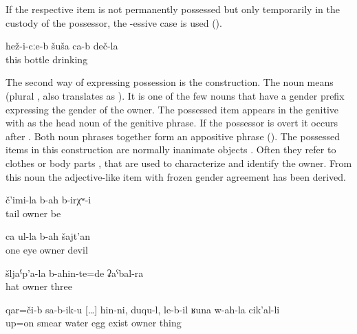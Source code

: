 If the respective item is not permanently possessed but only temporarily in the custody of the possessor, the -essive case is used  ().
%
\begin{exe}
	\ex	\label{ex:‎‎He has a bottle with a drink}
	\gll	hež-i-cːe-b	šuša	ca-b	deč-la\\
		this	bottle		drinking\\
	\glt	{}
\end{exe}

The second way of expressing possession is the  construction. The noun  means  (plural , also translates as ). It is one of the few nouns that have a gender prefix expressing the gender of the owner. The possessed item appears in the genitive with  as the head noun of the genitive phrase. If the possessor is overt it occurs after . Both noun phrases together form an appositive phrase (). The possessed items in this construction are normally inanimate objects . Often they refer to clothes  or body parts ,  that are used to characterize and identify the owner. From this noun the adjective-like item   with frozen gender agreement has been derived.
%
\begin{exe}
	\ex	\label{ex:There was one with a tail}
	\gll	č'imi-la	b-ah	b-irχʷ-i\\
		tail	owner	be\\
	\glt	{}

	\ex	\label{ex:the devil with one eye}
	\gll	ca	ul-la	b-ah	šajt'an\\
		one	eye	owner	devil\\
	\glt	{}

	\ex	\label{ex:‎All three had hats}
	\gll	šljaˁp'a-la	b-ahin-te=de	ʡaˁbal-ra\\
		hat	owner	three\\
	\glt	{}

	\ex	\label{ex:‎On the upper side you smear water, egg, whatever you have}
	\gll	qar=či-b	sa-b-ik-u	[\ldots] hin-ni,	duqu-l, le-b-il	ʁuna	w-ah-la	cik'al-li\\
		up=on	smear {}	water\tsc{-erg}	egg	exist		owner	thing\\
	\glt	{}
\end{exe}
